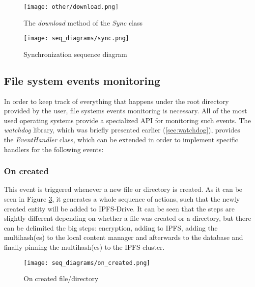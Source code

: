 \documentclass[12pt]{report}
\begin{document}
\bigskip
\bigskip
\bigskip
\bigskip

\begin{figure}[H]
\centerline{\texttt{[image: other/download.png]}}
    \caption{The \textit{download} method of the \textit{Sync} class}
    \label{fig:download}
\end{figure}

\begin{figure}[H]
\centerline{\texttt{[image: seq\_diagrams/sync.png]}}
    \caption{Synchronization sequence diagram}
    \label{fig:sync}
\end{figure}

\subsection{File system events monitoring}
\label{sec:fsem}

In order to keep track of everything that happens under the root directory provided by the user, file systems events monitoring is necessary. All of the most used operating systems provide a specialized API for monitoring such events. The \textit{watchdog} library, which was briefly presented earlier (\ref{sec:watchdog}), provides the \textit{EventHandler} class, which can be extended in order to implement specific handlers for the following events:

\subsubsection{On created}
This event is triggered whenever a new file or directory is created. As it can be seen in Figure \ref{fig:oncreated}, it generates a whole sequence of actions, such that the newly created entity will be added to IPFS-Drive. It can be seen that the steps are slightly different depending on whether a file was created or a directory, but there can be delimited the big steps: encryption, adding to IPFS, adding the multihash(es) to the local content manager and afterwards to the database and finally pinning the multihash(es) to the IPFS cluster.

\begin{figure}[H]
\centerline{\texttt{[image: seq\_diagrams/on\_created.png]}}
    \caption{On created file/directory}
    \label{fig:oncreated}
\end{figure}
\end{document}
